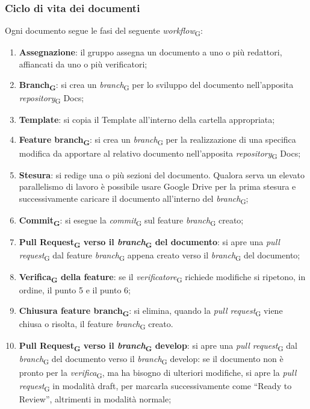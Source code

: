 \subsubsection{Ciclo di vita dei documenti}
Ogni documento segue le fasi del seguente \textit{workflow}\textsubscript{G}:
\begin{enumerate}
    \item \textbf{Assegnazione}: il gruppo assegna un documento a uno o più redattori, affiancati da uno o più verificatori;
    \item \textbf{Branch\textsubscript{G}}: si crea un \textit{branch}\textsubscript{G} per lo sviluppo del documento nell’apposita \textit{repository}\textsubscript{G} Docs;
    \item \textbf{Template}: si copia il Template all'interno della cartella appropriata;
    \item \textbf{Feature branch\textsubscript{G}}: si crea un \textit{branch}\textsubscript{G} per la realizzazione di una specifica modifica da apportare al relativo documento nell’apposita \textit{repository}\textsubscript{G} Docs;
    \item \textbf{Stesura}: si redige una o più sezioni del documento. Qualora serva un elevato parallelismo di lavoro è possibile usare Google Drive per la prima stesura e successivamente caricare il documento all’interno del \textit{branch}\textsubscript{G};
    \item \textbf{Commit\textsubscript{G}}: si esegue la \textit{commit}\textsubscript{G} sul feature \textit{branch}\textsubscript{G} creato;
    \item \textbf{Pull Request\textsubscript{G} verso il \textit{branch}\textsubscript{G} del documento}: si apre una \textit{pull request}\textsubscript{G} dal feature \textit{branch}\textsubscript{G} appena creato verso il \textit{branch}\textsubscript{G} del documento;
    \item \textbf{Verifica\textsubscript{G} della feature}: se il \textit{verificatore}\textsubscript{G} richiede modifiche si ripetono, in ordine, il punto 5 e il punto 6;
    \item \textbf{Chiusura feature branch\textsubscript{G}}: si elimina, quando la \textit{pull request}\textsubscript{G} viene chiusa o risolta, il feature \textit{branch}\textsubscript{G} creato.
    \item \textbf{Pull Request\textsubscript{G} verso il \textit{branch}\textsubscript{G} develop}: si apre una \textit{pull request}\textsubscript{G} dal \textit{branch}\textsubscript{G} del documento verso il \textit{branch}\textsubscript{G} develop: se il documento non è pronto per la \textit{verifica}\textsubscript{G}, ma ha bisogno di ulteriori modifiche, si apre la \textit{pull request}\textsubscript{G} in modalità draft, per marcarla successivamente come “Ready to Review”, altrimenti in modalità normale;

\end{enumerate}
